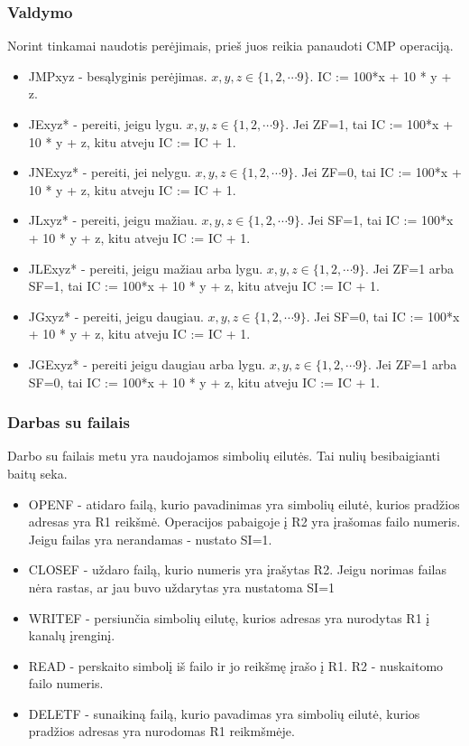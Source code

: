 \documentclass{VUMIFInfKursinis}
\begin{document}
\subsubsection{Valdymo}
Norint tinkamai naudotis perėjimais, prieš juos reikia panaudoti CMP operaciją. 
\begin{itemize}
	\item JMPxyz - besąlyginis perėjimas. $x, y, z \in \{1, 2, \cdots 9 \}$. IC := 100*x + 10 * y + z.
	\item JExyz* - pereiti, jeigu lygu. $x, y, z \in \{1, 2, \cdots 9 \}$. Jei ZF=1, tai IC := 100*x + 10 * y + z, kitu atveju IC := IC + 1.
	\item JNExyz* - pereiti, jei nelygu. $x, y, z \in \{1, 2, \cdots 9 \}$. Jei ZF=0, tai IC := 100*x + 10 * y + z, kitu atveju IC := IC + 1.
	\item JLxyz* - pereiti, jeigu mažiau. $x, y, z \in \{1, 2, \cdots 9 \}$. Jei SF=1, tai IC := 100*x + 10 * y + z, kitu atveju IC := IC + 1.
	\item JLExyz* - pereiti, jeigu mažiau arba lygu. $x, y, z \in \{1, 2, \cdots 9 \}$. Jei ZF=1 arba SF=1, tai IC := 100*x + 10 * y + z, kitu atveju IC := IC + 1.
	\item JGxyz* - pereiti, jeigu daugiau. $x, y, z \in \{1, 2, \cdots 9 \}$. Jei SF=0, tai IC := 100*x + 10 * y + z, kitu atveju IC := IC + 1.
	\item JGExyz* - pereiti jeigu daugiau arba lygu. $x, y, z \in \{1, 2, \cdots 9 \}$. Jei ZF=1 arba SF=0, tai IC := 100*x + 10 * y + z, kitu atveju IC := IC + 1.
\end{itemize}

\subsubsection{Darbas su failais}
Darbo su failais metu yra naudojamos simbolių eilutės. Tai nulių besibaigianti baitų seka.
\begin{itemize}
	\item OPENF - atidaro failą, kurio pavadinimas yra simbolių eilutė, kurios pradžios adresas yra R1 reikšmė. Operacijos pabaigoje į R2 yra įrašomas failo numeris. Jeigu failas yra nerandamas - nustato SI=1.
	\item CLOSEF - uždaro failą, kurio numeris yra įrašytas  R2. Jeigu norimas failas nėra rastas, ar jau buvo uždarytas yra nustatoma SI=1
	\item WRITEF - persiunčia simbolių eilutę, kurios adresas yra nurodytas R1 į kanalų įrenginį.
	\item READ - perskaito simbolį iš failo ir jo reikšmę įrašo į R1. R2 - nuskaitomo failo numeris.
	\item DELETF - sunaikiną failą, kurio pavadimas yra simbolių eilutė, kurios pradžios adresas yra nurodomas R1 reikmšmėje.
\end{itemize}
\end{document}
